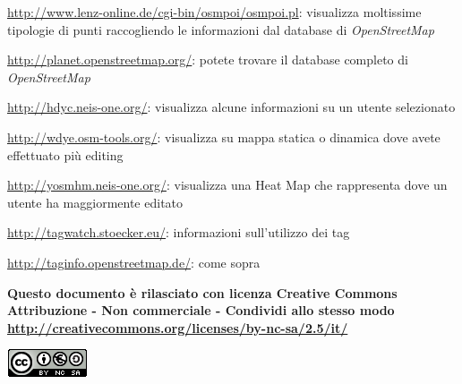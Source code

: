 \documentclass[a4paper,twoside,12pt,]{article}
\newcommand{\osm}{\emph{OpenStreetMap}\xspace}
\begin{document}
\url{http://www.lenz-online.de/cgi-bin/osmpoi/osmpoi.pl}: visualizza moltissime tipologie di punti raccogliendo le informazioni dal database di \osm

\url{http://planet.openstreetmap.org/}: potete trovare il database completo di \osm

\url{http://hdyc.neis-one.org/}: visualizza alcune informazioni su un utente selezionato

\url{http://wdye.osm-tools.org/}: visualizza su mappa statica o dinamica dove avete effettuato più editing

\url{http://yosmhm.neis-one.org/}: visualizza una Heat Map che rappresenta dove un utente ha maggiormente editato

\url{http://tagwatch.stoecker.eu/}: informazioni sull'utilizzo dei tag

\url{http://taginfo.openstreetmap.de/}: come sopra

\vfill
\begin{center}\begin{small}\textbf{
Questo documento è rilasciato con licenza 
Creative Commons Attribuzione - Non commerciale - Condividi allo stesso modo
\url{http://creativecommons.org/licenses/by-nc-sa/2.5/it/}}\end{small}\end{center}
\begin{center}
 \includegraphics{ccbysa.png}
\end{center}
\end{document}

